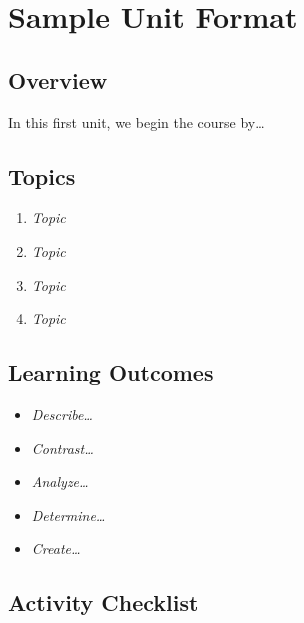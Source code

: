 \documentclass[
]{book}
\providecommand{\tightlist}{%
  \setlength{\itemsep}{0pt}\setlength{\parskip}{0pt}}
\begin{document}
\hypertarget{sample-unit-format}{%
\chapter*{Sample Unit Format}\label{sample-unit-format}}

\hypertarget{overview-2}{%
\section*{Overview}\label{overview-2}}

In this first unit, we begin the course by\ldots{}

\hypertarget{topics-2}{%
\section*{Topics}\label{topics-2}}

\begin{enumerate}
\def\labelenumi{\arabic{enumi}.}
\tightlist
\item
  \emph{Topic}\\
\item
  \emph{Topic}\\
\item
  \emph{Topic}\\
\item
  \emph{Topic}
\end{enumerate}

\hypertarget{learning-outcomes-2}{%
\section*{Learning Outcomes}\label{learning-outcomes-2}}

\begin{itemize}
\tightlist
\item
  \emph{Describe\ldots{}}
\item
  \emph{Contrast\ldots{}}
\item
  \emph{Analyze\ldots{}}
\item
  \emph{Determine\ldots{}}
\item
  \emph{Create\ldots{}}
\end{itemize}

\hypertarget{activity-checklist-2}{%
\section*{Activity Checklist}\label{activity-checklist-2}}
\end{document}
